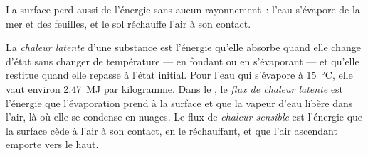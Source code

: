 La surface perd aussi de l'énergie sans aucun rayonnement~: l'eau s'évapore
de la mer et des feuilles, et le sol réchauffe l'air à son contact.

\begin{definition}\label{def:g10:earth-energy-budget:latent-heat}
La \emph{chaleur latente} d'une substance est
l'énergie qu'elle absorbe quand elle change d'état sans changer de
température --- en fondant ou en s'évaporant --- et qu'elle restitue quand
elle repasse à l'état initial. Pour l'eau qui s'évapore à
\qty{15}{\degreeCelsius}, elle vaut environ \qty{2.47}{MJ} par kilogramme.
Dans le , le \emph{flux de chaleur latente} est l'énergie
que l'évaporation prend à la surface et que la vapeur d'eau libère dans
l'air, là où elle se condense en nuages. Le flux de \emph{chaleur
sensible} est l'énergie que la surface cède à l'air
à son contact, en le réchauffant, et que l'air ascendant emporte vers le
haut.
\end{definition}

